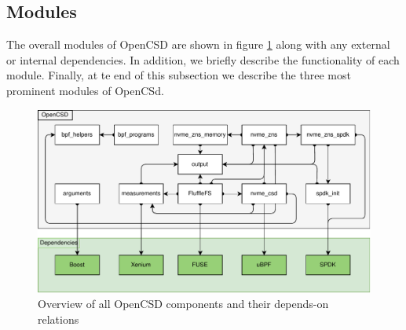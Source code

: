 \subsection{Modules}

The overall modules of OpenCSD are shown in figure
\ref{figure:moduledependencies} along with any external or internal
dependencies. In addition, we briefly describe the functionality of each module.
Finally, at te end of this subsection we describe the three most prominent
modules of OpenCSd.


\begin{figure}
    \centering
	\includegraphics[width=1\textwidth]{resources/images/module-dependencies.pdf}
	\caption{Overview of all OpenCSD components and their depends-on relations}
    \label{figure:moduledependencies}
\end{figure}

